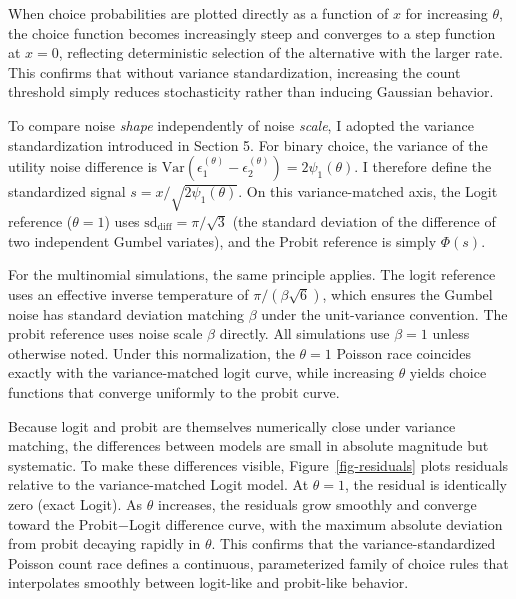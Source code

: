 \documentclass[
  man,
  floatsintext,
  longtable,
  a4paper,
  nolmodern,
  notxfonts,
  notimes,
  colorlinks=true,linkcolor=blue,citecolor=blue,urlcolor=blue]{apa7}
\begin{document}
When choice probabilities are plotted directly as a function of \(x\)
for increasing \(\theta\), the choice function becomes increasingly
steep and converges to a step function at \(x = 0\), reflecting
deterministic selection of the alternative with the larger rate. This
confirms that without variance standardization, increasing the count
threshold simply reduces stochasticity rather than inducing Gaussian
behavior.

To compare noise \emph{shape} independently of noise \emph{scale}, I
adopted the variance standardization introduced in Section 5. For binary
choice, the variance of the utility noise difference is
\(\text{Var}(\epsilon_1^{(\theta)} - \epsilon_2^{(\theta)}) = 2\psi_1(\theta)\).
I therefore define the standardized signal
\(s = x / \sqrt{2\psi_1(\theta)}\). On this variance-matched axis, the
Logit reference (\(\theta = 1\)) uses
\(\text{sd}_{\text{diff}} = \pi/\sqrt{3}\) (the standard deviation of
the difference of two independent Gumbel variates), and the Probit
reference is simply \(\Phi(s)\).

For the multinomial simulations, the same principle applies. The logit
reference uses an effective inverse temperature of
\(\pi / (\beta\sqrt{6})\), which ensures the Gumbel noise has standard
deviation matching \(\beta\) under the unit-variance convention. The
probit reference uses noise scale \(\beta\) directly. All simulations
use \(\beta = 1\) unless otherwise noted. Under this normalization, the
\(\theta = 1\) Poisson race coincides exactly with the variance-matched
logit curve, while increasing \(\theta\) yields choice functions that
converge uniformly to the probit curve.

Because logit and probit are themselves numerically close under variance
matching, the differences between models are small in absolute magnitude
but systematic. To make these differences visible,
Figure~\ref{fig-residuals} plots residuals relative to the
variance-matched Logit model. At \(\theta = 1\), the residual is
identically zero (exact Logit). As \(\theta\) increases, the residuals
grow smoothly and converge toward the Probit\(-\)Logit difference curve,
with the maximum absolute deviation from probit decaying rapidly in
\(\theta\). This confirms that the variance-standardized Poisson count
race defines a continuous, parameterized family of choice rules that
interpolates smoothly between logit-like and probit-like behavior.
\end{document}
